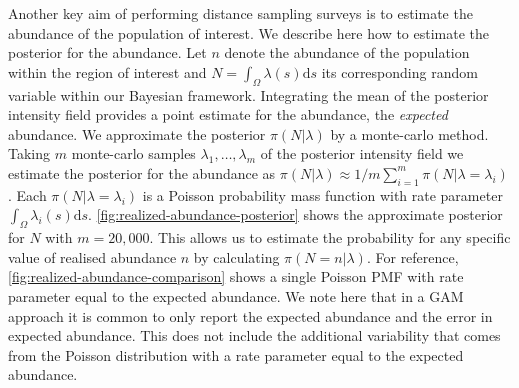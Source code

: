 \documentclass[preprint,12pt]{elsarticle}
\begin{document}

Another key aim of performing distance sampling surveys is to estimate the abundance of the population of interest.  We describe here how to estimate the posterior for the abundance. Let $n$ denote the abundance of the population within the region of interest and $N = \int_{\Omega}\lambda(s)\mathrm{d}s$ its corresponding random variable within our Bayesian framework.  Integrating the mean of the posterior intensity field provides a point estimate for the abundance, the \textit{expected} abundance.  We approximate the posterior $\pi(N | \lambda)$ by a monte-carlo method.  Taking $m$ monte-carlo samples  $\lambda_1, \ldots, \lambda_m$ of the posterior intensity field we estimate the posterior for the abundance as $\pi(N | \lambda) \approx 1 / m \sum_{i=1}^m \pi (N | \lambda = \lambda_i)$. Each $\pi(N | \lambda = \lambda_i)$ is a Poisson probability mass function with rate parameter $\int_{\Omega}\lambda_i(s)\mathrm{d}s$. \autoref{fig:realized-abundance-posterior} shows the approximate posterior for $N$ with $m = 20,000$.  This allows us to estimate the probability for any specific value of realised abundance $n$ by calculating $\pi(N = n | \lambda)$.  For reference, \autoref{fig:realized-abundance-comparison} shows a single Poisson PMF with rate parameter equal to the expected abundance. We note here that in a GAM approach it is common to only report the expected abundance and the error in expected abundance.  This does not include the additional variability that comes from the Poisson distribution with a rate parameter equal to the expected abundance.  
\end{document}
